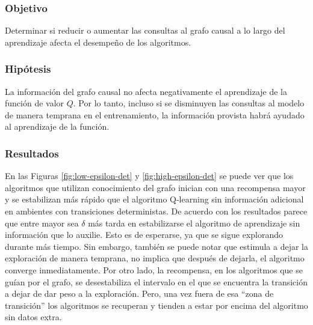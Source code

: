 \subsubsection{Objetivo}

Determinar si reducir o aumentar las consultas al grafo causal a lo largo del aprendizaje afecta el desempeño
de los algoritmos.

\subsubsection{Hipótesis}

La información del grafo causal no afecta negativamente 
el aprendizaje de la función de valor $Q$. Por lo tanto, incluso si se disminuyen las consultas al modelo de manera temprana en el entrenamiento, la información provista habrá
ayudado al aprendizaje de la función.

\subsubsection{Resultados}

En las Figuras \ref{fig:low-epsilon-det} y \ref{fig:high-epsilon-det} se puede ver que los algoritmos que utilizan conocimiento del grafo inician con una recompensa mayor y se estabilizan más rápido que el algoritmo Q-learning
sin información adicional en ambientes con transiciones deterministas. 
De acuerdo con los resultados parece que 
entre mayor sea $\delta$ más tarda en estabilizarse
el algoritmo de aprendizaje sin información que lo auxilie. Esto es de esperarse, ya que se sigue explorando durante más tiempo. Sin embargo,
también se puede notar que estimula a dejar
la exploración de manera temprana, no implica que después
de dejarla, el algoritmo converge inmediatamente. Por otro lado, 
la recompensa, en los algoritmos que se guían por el grafo, se desestabiliza
el intervalo en el que se encuentra la transición a dejar de dar peso a 
la exploración. Pero, una vez fuera de esa ``zona de transición'' los
algoritmos se recuperan y tienden a estar por encima del algoritmo sin datos 
extra.


